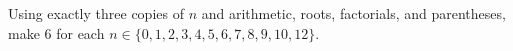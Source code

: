 Using exactly three copies of $n$ and arithmetic, roots, factorials, and parentheses, make 6 for each $n\in\{0,1,2,3,4,5,6,7,8,9,10,12\}$.
